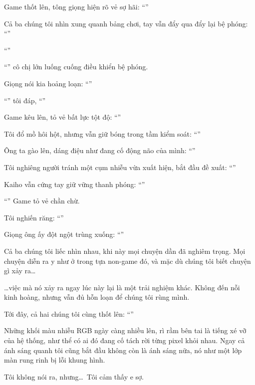 \documentclass[../main.tex]{subfiles}
\begin{document}
Game thốt lên, tông giọng hiện rõ vẻ sợ hãi: ``''

Cả ba chúng tôi nhìn xung quanh bảng chơi, tay vẫn đẩy qua đẩy lại bệ phóng: ``''

``''

``'' cô chị lớn luống cuống điều khiển bệ phóng.

Giọng nói kia hoảng loạn: ``''

``''  tôi đáp, ``''

Game kêu lên, tỏ vẻ bất lực tột độ: ``''

Tôi đổ mồ hôi hột, nhưng vẫn giữ bóng trong tầm kiểm soát: ``''

Ông ta gào lên, dáng điệu như đang cố động não của mình: ``''

Tôi nghiêng người tránh một cụm nhiễu vừa xuất hiện, bắt đầu đề xuất: ``''

Kaiho vẫn cứng tay giữ vững thanh phóng: ``''

``'' Game tỏ vẻ chần chừ.

Tôi nghiến răng: ``''

Giọng ông ấy đột ngột trùng xuống: ``''

Cả ba chúng tôi liếc nhìn nhau, khi này mọi chuyện dần đã nghiêm trọng. Mọi chuyện diễn ra y như ở trong tựa non-game đó, và mặc dù chúng tôi biết chuyện gì xảy ra\dots

\dots việc mà nó xảy ra ngay lúc này lại là một trải nghiệm khác. Không đến nỗi kinh hoàng, nhưng vẫn đủ hỗn loạn để chúng tôi rùng mình.

Tới đây, cả hai chúng tôi cùng thốt lên: ``''

Những khối màu nhiễu RGB ngày càng nhiều lên, rì rầm bên tai là tiếng xé vỡ của hệ thống, như thể có ai đó đang cố tách rời từng pixel khỏi nhau. Ngay cả ánh sáng quanh tôi cũng bắt đầu không còn là ánh sáng nữa, nó như một lớp màn rung rinh bị lỗi khung hình.

Tôi không nói ra, nhưng\dots\ Tôi cảm thấy e sợ.
\end{document}
